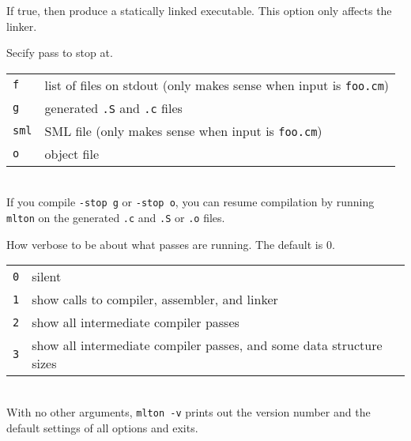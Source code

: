 \begin{description}
If true, then produce a statically linked executable.  This option only
affects the linker.

Secify pass to stop at.\\
\begin{tabular}{ll}
{\tt f} & list of files on stdout (only makes sense when input is {\tt foo.cm})\\
{\tt g} & generated {\tt .S} and {\tt .c} files\\
{\tt sml} & SML file (only makes sense when input is {\tt foo.cm})\\
{\tt o} & object file\\
\end{tabular}\\
If you compile {\tt -stop g} or {\tt -stop o}, you can resume compilation by
running {\tt mlton} on the generated {\tt .c} and {\tt .S} or {\tt .o} files.

How verbose to be about what passes are running.  The default is 0.\\
\begin{tabular}{ll}
{\tt 0} & silent\\
{\tt 1} & show calls to compiler, assembler, and linker\\
{\tt 2} & show all intermediate compiler passes\\
{\tt 3} & show all intermediate compiler passes, and some data structure sizes\\
\end{tabular}\\
With no other arguments, {\tt mlton -v} prints out the version number and the
default settings of all options and exits.

\end{description}

%
%
%
%
%
%

